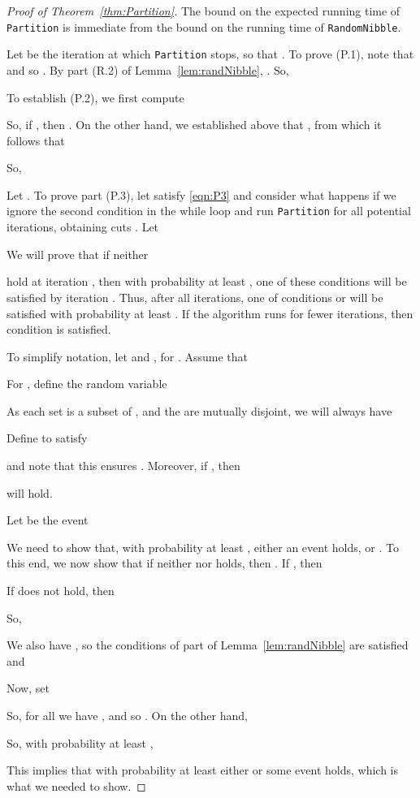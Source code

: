\documentclass[11pt]{article}
\begin{document}
\begin{proof}[Proof of Theorem~\ref{thm:Partition}]
The bound on the expected running time of \texttt{Partition}
  is immediate from the bound on the running time of \texttt{RandomNibble}.

Let  be the iteration at which \texttt{Partition} stops,
  so that .
To prove (P.1), note that
   and so
  .
By part (R.2) of Lemma~\ref{lem:randNibble},
  .
So,


To establish (P.2),
  we first compute

So, if  ,
  then .
On the other hand, we established above that
  , from which
  it follows that

So,


Let .
To prove part (P.3), let  satisfy \eqref{eqn:P3} and
  consider what happens if we ignore the second condition in the
  while loop and run
  \texttt{Partition} for all
  potential  iterations, obtaining
  cuts .
Let 

We will prove that if neither 

hold at iteration , then with probability at least , one of these
  conditions will be satisfied by iteration .
Thus, after all  iterations, one of conditions
   or  will be satisfied with probability
  at least .
If the algorithm runs for fewer iterations, then condition 
  is satisfied.

To simplify notation, let  and ,
  for .
Assume that

For , define the random variable

As each set  is a subset of , and the  are mutually
  disjoint, we will always have

Define  to satisfy

and note that this ensures .
Moreover, if , then 
  
  will hold.

Let   be the event

We need to show that, with probability at least , either an
  event  holds, or .
To this end, we now show that if neither 
  nor  holds,
  then .
If , then

If  does not hold, then

So,

We also have ,
 so the conditions of 
 part  of Lemma~\ref{lem:randNibble} are satisfied and


Now, set 

So, for all  we have , 
  and so .
On the other hand,
  

So, with probability at least , 

This implies that with probability at least  either
   or some event  holds,
  which is what we needed to show.
\end{proof}





\end{document}
